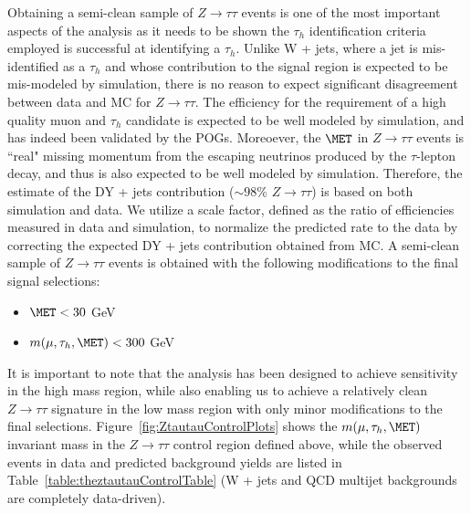 Obtaining a semi-clean sample of $Z\to\tau\tau$ events is one of the most important aspects of the analysis as it needs to be shown the $\tau_{h}$ identification 
criteria employed is successful at identifying a $\tau_{h}$. Unlike W + jets, where a jet is mis-identified as a $\tau_{h}$ and whose contribution to the 
signal region is expected to be mis-modeled by simulation, there is no reason to expect significant disagreement between data and MC for $Z\to\tau\tau$. The 
efficiency for the requirement of a high quality muon and $\tau_{h}$ candidate is expected to be well modeled by simulation, and has indeed been validated by the 
POGs. Moreoever, the $\MET$ in $Z\to\tau\tau$ events is ``real" missing momentum from the escaping neutrinos produced by the $\tau$-lepton decay, 
and thus is also expected to be well modeled by simulation. Therefore, the estimate of the DY + jets contribution ($\sim 98$\% $Z\to\tau\tau$) is based on both 
simulation and data. We utilize a scale factor, defined as the ratio of efficiencies measured in data and simulation, to normalize the predicted rate 
to the data by correcting the expected DY + jets contribution obtained from MC. A semi-clean sample of $Z \to \tau\tau$ events is obtained with the following 
modifications to the final signal selections:

\begin{itemize}
\item $\MET < 30$ GeV 
\item $m(\mu,\tau_{h},\MET) < 300$ GeV
\end{itemize}

It is important to note that the analysis has been designed to achieve sensitivity in the high mass region, while also enabling us to achieve a relatively clean 
$Z\rightarrow\tau\tau$ signature in the low mass region with only minor modifications to the final selections. Figure~\ref{fig:ZtautauControlPlots} shows the 
$m(\mu,\tau_{h},\MET)$ invariant mass in the $Z\rightarrow\tau\tau$ control region defined above, while the observed events in data and predicted 
background yields are listed in Table~\ref{table:theztautauControlTable} (W + jets and QCD multijet backgrounds are completely data-driven).

